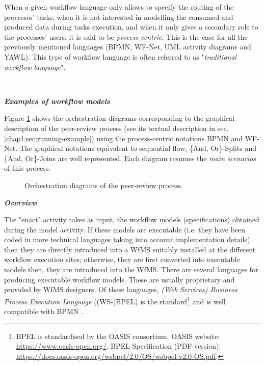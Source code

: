 When a given workflow language only allows to specify the routing of the processes' tasks, when it is not interested in modelling the consumed and produced data during tasks execution, and when it only gives a secondary role to the processes' users, it is said to be \textit{process-centric}. This is the case for all the previously mentioned languages (BPMN, WF-Net, UML activity diagrams and YAWL). This type of workflow language is often referred to as "\textit{traditional workflow language}".

~

\noindent\textbf{\textit{Examples of workflow models}}

Figure \ref{chap1:fig:comparing-workflow-languages} shows the orchestration diagrams corresponding to the graphical description of the peer-review process (see its textual description in sec. \ref{chap1:sec:running-example}) using the process-centric notations BPMN and WF-Net. The graphical notations equivalent to sequential flow, \{And, Or\}-Splits and \{And, Or\}-Joins are well represented. Each diagram resumes the \textit{main scenarios} of this process.
\begin{figure}[ht!]
	\noindent
	\caption{Orchestration diagrams of the peer-review process.}
	\label{chap1:fig:comparing-workflow-languages}
\end{figure}


\label{chap1:sec:bpm-enact-activity}
\noindent\textbf{\textit{Overview}}

The "enact" activity takes as input, the workflow models (specifications) obtained during the model activity. If these models are executable (i.e. they have been coded in more technical languages taking into account implementation details) then they are directly introduced into a WfMS suitably installed at the different workflow execution sites; otherwise, they are first converted into executable models then, they are introduced into the WfMS. There are several languages for producing executable workflow models. These are usually proprietary and provided by WfMS designers. Of these languages, \textit{(Web Services) Business Process Execution Language} ((WS-)BPEL) is the standard\footnote{BPEL is standardised by the OASIS consortium. OASIS website: \url{https://www.oasis-open.org/}. BPEL Specification (PDF version): \url{https://docs.oasis-open.org/wsbpel/2.0/OS/wsbpel-v2.0-OS.pdf}.} and is well compatible with BPMN \cite{white2005using, ouyang2006bpmn, leymann2010bpel}.

